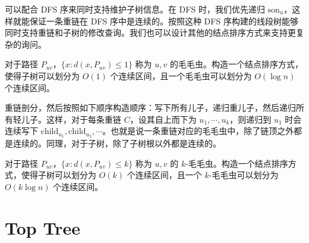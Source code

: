 可以配合 DFS 序来同时支持维护子树信息。在 DFS 时，我们优先递归 $\mathrm{son}_u$，这样就能保证一条重链在 DFS 序中是连续的。按照这种 DFS 序构建的线段树能够同时支持重链和子树的修改查询。我们也可以设计其他的结点排序方式来支持更复杂的询问。

\begin{example}[毛毛虫剖分]
    对于路径 $P_{uv}$，$\{x:d(x,P_{uv})\le 1\}$ 称为 $u,v$ 的毛毛虫。构造一个结点排序方式，使得子树可以划分为 $O(1)$ 个连续区间，且一个毛毛虫可以划分为 $O(\log n)$ 个连续区间。
\end{example}
\begin{solution}
    重链剖分，然后按照如下顺序构造顺序：写下所有儿子，递归重儿子，然后递归所有轻儿子。这样，对于每条重链 $C$，设其自上而下为 $u_1,\cdots,u_k$，则递归到 $u_1$ 时会连续写下 $\mathrm{child}_{u_1},\mathrm{child}_{u_2},\cdots$。也就是说一条重链对应的毛毛虫中，除了链顶之外都是连续的。同理，对于子树，除了子树根以外都是连续的。
\end{solution}
\begin{exercise}[$k$-毛毛虫剖分]
    对于路径 $P_{uv}$，$\{x:d(x,P_{uv})\le k\}$ 称为 $u,v$ 的 $k$-毛毛虫。构造一个结点排序方式，使得子树可以划分为 $O(k)$ 个连续区间，且一个 $k$-毛毛虫可以划分为 $O(k\log n)$ 个连续区间。
\end{exercise}

\section{Top Tree}

